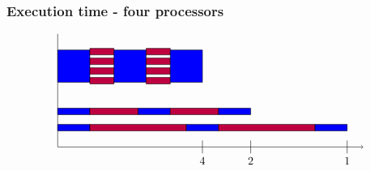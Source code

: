 \documentclass{beamer}
\begin{document}
\begin{frame}
  \frametitle{Execution time - four processors}
\[
  \tikz{
    \draw[->] (0,3) -- (0,-0.5) -- (9.5,-0.5);
    \filldraw[draw,fill=blue] (0,0) rectangle +(1,0.2);
    \filldraw[draw,fill=purple] (1,0) rectangle +(3,0.2);
    \filldraw[draw,fill=blue] (4,0) rectangle +(1,0.2);
    \filldraw[draw,fill=purple] (5,0) rectangle +(3,0.2);
    \filldraw[draw,fill=blue] (8,0) rectangle +(1,0.2);
    \filldraw[draw,fill=blue] (0,0.5) rectangle +(1,0.2);
    \filldraw[draw,fill=purple] (1,0.5) rectangle +(1.5,0.2);
    \filldraw[draw,fill=blue] (2.5,0.5) rectangle +(1,0.2);
    \filldraw[draw,fill=purple] (3.5,0.5) rectangle +(1.5,0.2);
    \filldraw[draw,fill=blue] (5,0.5) rectangle +(1,0.2);
    \filldraw[draw,fill=blue] (0,1.5) rectangle +(1,1);
    \filldraw[draw,fill=purple] (1,1.45) rectangle +(0.75,0.2);
    \filldraw[draw,fill=purple] (1,1.75) rectangle +(0.75,0.2);
    \filldraw[draw,fill=purple] (1,2.05) rectangle +(0.75,0.2);
    \filldraw[draw,fill=purple] (1,2.35) rectangle +(0.75,0.2);
    \filldraw[draw,fill=blue] (1.75,1.5) rectangle +(1,1);
    \filldraw[draw,fill=purple] (2.75,1.45) rectangle +(0.75,0.2);
    \filldraw[draw,fill=purple] (2.75,1.75) rectangle +(0.75,0.2);
    \filldraw[draw,fill=purple] (2.75,2.05) rectangle +(0.75,0.2);
    \filldraw[draw,fill=purple] (2.75,2.35) rectangle +(0.75,0.2);
    \filldraw[draw,fill=blue] (3.5,1.5) rectangle +(1,1);
    \draw (9,-0.3) -- (9,-0.7) node [below] {1};
    \draw (6,-0.3) -- (6,-0.7) node [below] {2};
    \draw (4.5,-0.3) -- (4.5,-0.7) node [below] {4};
  }
\]
\end{frame}
\end{document}
